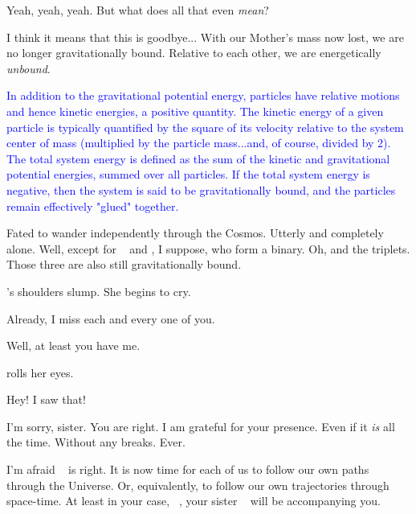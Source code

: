 \documentclass[main.tex]{subfiles}
\begin{document}
\par \Taygete Yeah, yeah, yeah.  But what does all that even \textit{mean}?

\par \Sterope I think it means that this is goodbye...  With our Mother's mass now lost, we are no longer gravitationally bound.  Relative to each other, we are energetically \textit{unbound}.

\begin{tcolorbox}[sharp corners, colback=blue!30, colframe=blue!80!blue, title=Kinetic and Total Energy]
\par \textcolor{blue} {In addition to the gravitational potential energy, particles have relative motions and hence kinetic energies, a positive quantity.  The kinetic energy of a given particle is typically quantified by the square of its velocity relative to the system center of mass (multiplied by the particle mass...and, of course, divided by 2).  The total system energy is defined as the sum of the kinetic and gravitational potential energies, summed over all particles.  If the total system energy is negative, then the system is said to be gravitationally bound, and the particles remain effectively "glued" together.}  
\end{tcolorbox}

\par \Sterope Fated to wander independently through the Cosmos.  Utterly and completely alone.  Well, except for \rmmaia~ and \rmmerope, I suppose, who form a binary.  Oh, and the triplets.  Those three are also still gravitationally bound.

\par \nar \rmalcyone's shoulders slump.  She begins to cry.

\par \Alcyone Already, I miss each and every one of you.

\par \Taygete Well, at least you have me.

\par \nar \rmalcyone rolls her eyes.

\par \Taygete Hey!  I saw that!

\par \Alcyone I'm sorry, sister.  You are right.  I am grateful for your presence.  Even if it \textit{is} all the time.  Without any breaks.  Ever.

\par \Maia I'm afraid \rmalcyone~ is right.  It is now time for each of us to follow our own paths through the Universe.  Or, equivalently, to follow our own trajectories through space-time.  At least in your case, \rmtaygete~, your sister \rmalcyone~ will be accompanying you.
\end{document}
